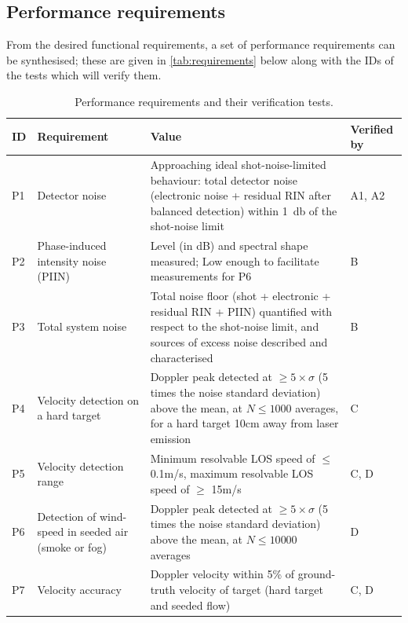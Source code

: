 \subsection{Performance requirements}
From the desired functional requirements, a set of performance requirements can be synthesised; these are given in \autoref{tab:requirements} below along with the IDs of the tests which will verify them. 

\begin{table}[H]
\centering
\small
\begin{tabular}{|p{0.5cm}|p{3cm}|p{9cm}|p{1.7cm}|}
\hline
\textbf{ID} & \textbf{Requirement} & \textbf{Value} & \textbf{Verified by} \\ \hline
P1 & Detector noise & Approaching ideal shot-noise-limited behaviour: total
     detector noise (electronic noise + residual RIN after balanced
     detection) within \SI{1}{\decibel} of the shot-noise limit
    & A1, A2 \\ \hline
 P2 & Phase-induced intensity noise (PIIN) & Level (in dB) and spectral shape measured; Low enough to facilitate measurements for P6 & B \\ \hline
P3 & Total system noise & Total noise floor (shot + electronic + residual RIN + PIIN) quantified with respect to the shot-noise limit, and sources of excess noise described and characterised & B \\ \hline
 P4 & Velocity detection on a hard target & Doppler peak detected at $ \geq 5\times\sigma$ (5 times the noise standard deviation) above the  mean, at $N \leq 1000$ averages, for a hard target 10cm away from laser emission & C \\ \hline
P5 & Velocity detection range & Minimum resolvable LOS speed of $\leq$ 0.1m/s, maximum resolvable LOS speed of $\geq$ 15m/s & C, D \\ \hline
P6 & Detection of wind-speed in seeded air (smoke or fog) & Doppler peak detected at $ \geq 5\times\sigma$ (5 times the noise standard deviation) above the  mean, at $N \leq 10 000$ averages 
& D \\ \hline
P7 & Velocity accuracy & Doppler velocity within 5\% of ground-truth velocity of target (hard target and seeded flow) & C, D \\
\hline
\end{tabular}
\caption{Performance requirements and their verification tests.}
\label{tab:requirements}
\end{table}

